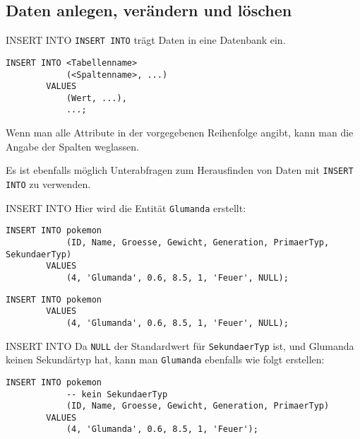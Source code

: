 \subsection{Daten anlegen, verändern und löschen}

\begin{sql}{INSERT INTO}
    \texttt{INSERT INTO} trägt Daten in eine Datenbank ein.

    \begin{lstlisting}[language=mysql]
        INSERT INTO <Tabellenname>
            (<Spaltenname>, ...)
        VALUES
            (Wert, ...),
            ...;
    \end{lstlisting}

    Wenn man alle Attribute in der vorgegebenen Reihenfolge angibt, kann man die Angabe der Spalten weglassen.

    Es ist ebenfalls möglich Unterabfragen zum Herausfinden von Daten mit \texttt{INSERT INTO} zu verwenden.
\end{sql}

\begin{example}{INSERT INTO}
    Hier wird die Entität \texttt{Glumanda} erstellt:

    \begin{lstlisting}[language=mysql]
        INSERT INTO pokemon
            (ID, Name, Groesse, Gewicht, Generation, PrimaerTyp, SekundaerTyp)
        VALUES
            (4, 'Glumanda', 0.6, 8.5, 1, 'Feuer', NULL);
    \end{lstlisting}

    \begin{lstlisting}[language=mysql]
        INSERT INTO pokemon
        VALUES
            (4, 'Glumanda', 0.6, 8.5, 1, 'Feuer', NULL);
    \end{lstlisting}
\end{example}

\begin{example}{INSERT INTO}
    Da \texttt{NULL} der Standardwert für \texttt{SekundaerTyp} ist, und Glumanda keinen Sekundärtyp hat, kann man \texttt{Glumanda} ebenfalls wie folgt erstellen:

    \begin{lstlisting}[language=mysql]
        INSERT INTO pokemon
            -- kein SekundaerTyp
            (ID, Name, Groesse, Gewicht, Generation, PrimaerTyp)
        VALUES
            (4, 'Glumanda', 0.6, 8.5, 1, 'Feuer');
    \end{lstlisting}
\end{example}

